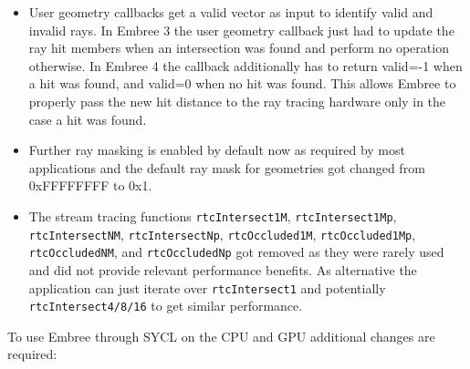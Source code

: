 \begin{itemize}
  \texttt{rtcOccluded} functions is only invoked for some geometry if
  enabled through
  \texttt{rtcSetGeometryEnableFilterFunctionFromArguments} for that
  geometry. Alternatively, argument filter functions can get enabled for
  all geometries using the
  \texttt{RTC\_RAY\_QUERY\_FLAG\_INVOKE\_ARGUMENT\_FILTER} ray query
  flag.
\item
  User geometry callbacks get a valid vector as input to identify valid
  and invalid rays. In Embree 3 the user geometry callback just had to
  update the ray hit members when an intersection was found and perform
  no operation otherwise. In Embree 4 the callback additionally has to
  return valid=-1 when a hit was found, and valid=0 when no hit was
  found. This allows Embree to properly pass the new hit distance to the
  ray tracing hardware only in the case a hit was found.
\item
  Further ray masking is enabled by default now as required by most
  applications and the default ray mask for geometries got changed from
  0xFFFFFFFF to 0x1.
\item
  The stream tracing functions \texttt{rtcIntersect1M},
  \texttt{rtcIntersect1Mp}, \texttt{rtcIntersectNM},
  \texttt{rtcIntersectNp}, \texttt{rtcOccluded1M},
  \texttt{rtcOccluded1Mp}, \texttt{rtcOccludedNM}, and
  \texttt{rtcOccludedNp} got removed as they were rarely used and did
  not provide relevant performance benefits. As alternative the
  application can just iterate over \texttt{rtcIntersect1} and
  potentially \texttt{rtcIntersect4/8/16} to get similar performance.
\end{itemize}

To use Embree through SYCL on the CPU and GPU additional changes are
required:

